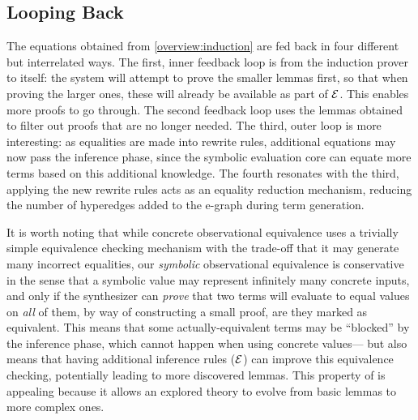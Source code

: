 \subsection{Looping Back}

The equations obtained from \autoref{overview:induction} are fed back in
four different but interrelated ways.
The first, inner feedback loop is from the induction prover to itself:
the system will attempt to prove the smaller lemmas first, so that when
proving the larger ones, these will already be available as part of $\mathcal{E}$.
This enables more proofs to go through.
The second feedback loop uses the lemmas obtained to filter out proofs that are no longer needed.
The third, outer loop is more interesting: as equalities are made into
rewrite rules, additional equations may now pass the inference phase,
since the symbolic evaluation core can equate more terms based on this
additional knowledge.
The fourth resonates with the third, applying the new rewrite rules acts as an equality reduction mechanism, reducing the number of hyperedges added to the e-graph during term generation.

It is worth noting that while concrete observational equivalence uses
a trivially simple equivalence checking mechanism with the trade-off
that it may generate many incorrect equalities,
our \emph{symbolic} observational equivalence is conservative in the
sense that a symbolic value may represent infinitely many concrete
inputs, and only if the synthesizer can \emph{prove} that two terms will
evaluate to equal values on \emph{all} of them, by way of constructing
a small proof, are they marked as equivalent.
This means that some actually-equivalent terms may be ``blocked'' by
the inference phase, which cannot happen when using concrete values---%
but also means that having additional inference rules ($\mathcal{E}$) can improve this equivalence checking, 
potentially leading to more discovered lemmas.
This property of \TheSy is appealing because it allows an explored theory to evolve from basic lemmas to more complex ones.

